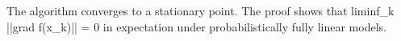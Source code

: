 The algorithm converges to a stationary point. The proof shows that liminf_k ||grad f(x_k)|| = 0 in expectation under probabilistically fully linear models.
